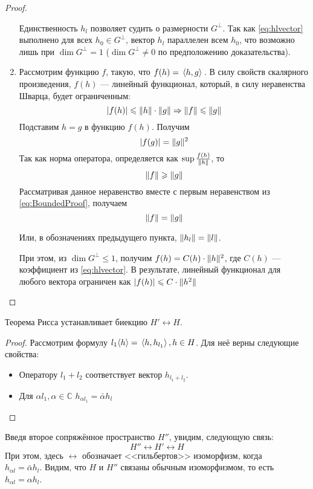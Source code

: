 \begin{proof}
\begin{enumerate}
			{\footnotesize
				Единственность $h_l$ позволяет судить о размерности $G^{\perp}$.
				Так как \eqref{eq:hlvector} выполнено для всех $h_0 \in G^{\perp}$, вектор $h_l$ параллелен всем $h_0$, 
				что возможно лишь при $\dim{G^{\perp}} = 1$ ($\dim{G^{\perp}} \neq 0$ по предположению доказательства).
			}
			
			\item Рассмотрим функцию $f$, такую, что $f(h) = \, \langle h, g \rangle \,$. В силу свойств скалярного произведения, 
			$f(h)$ --- линейный функционал, который, в силу неравенства Шварца, будет ограниченным:
			\begin{equation} \label{eq:BoundedProof}
				|f(h)| \leqslant \| h \| \cdot \| g \| \Rightarrow \| f \| \leqslant \| g \|
			\end{equation}
			Подставим $h = g$ в функцию $f(h)$. Получим
			$$|f(g)| = \| g \|^2$$
			Так как норма оператора, определяется как $\sup \frac{f(h)}{\| h \|}$, то 
			$$\| f \| \geqslant \| g \|$$
			Рассматривая данное неравенство вместе с первым неравенством из \eqref{eq:BoundedProof}, получаем 
			$$ \| f \| = \| g \| $$
			
			Или, в обозначениях предыдущего пункта, $\| h_l \| = \| l \|$.
			
			{\footnotesize
				При этом, из $\dim{G^{\perp}} \leq 1$, получим $f(h) = C(h) \cdot \| h \|^2$, где $C(h)$ --- коэффициент из 
				\eqref{eq:hlvector}. В результате, линейный функционал для любого вектора ограничен как 
				$|f(h)| \leqslant C \cdot \| h^2 \|$
			}
		\end{enumerate}
	\end{proof}
	
	\begin{note}
		Теорема Рисса устанавливает биекцию $H' \leftrightarrow H$.
	\end{note}
	\begin{proof}
		Рассмотрим формулу $l_1\langle h \rangle = \, \langle h, h_{l_1} \rangle \,, h \in H$. Для неё верны следующие
		свойства:
		\begin{itemize}
			\item Оператору $l_1 + l_2$ соответствует вектор $h_{l_1+l_2}$.
			\item Для $\alpha l_1, \alpha \in \mathbb{C}$ $h_{\alpha l_1} = \bar{\alpha} h_l$
		\end{itemize}
	\end{proof}
	
	Введя второе сопряжённое пространство $H''$, увидим, следующую связь:
	$$H'' \leftrightarrow H' \leftrightarrow H$$
	При этом, здесь $\leftrightarrow$ обозначает <<гильбертов>> изоморфизм, когда \\
	$h_{\alpha l} = \bar{\alpha} h_l$. %
	Видим, что $H$ и $H''$ связаны обычным изоморфизмом, то есть $h_{\alpha l} = \alpha h_l$.
	

